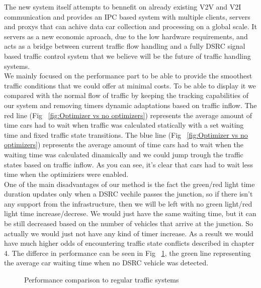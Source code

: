 \documentclass[17pt]{report}
\begin{document}
\indent
The new system itself attempts to bennefit on already existing V2V and V2I
communication and provides an IPC based system with multiple clients, servers
and proxys that can achive data car collection and processing on a global scale.
It servers as a new economic aproach, due to the low hardware requirements,
and acts as a bridge between current traffic flow handling and a fully 
DSRC signal based traffic control system that we believe will be the 
future of traffic handling systems. \\
\indent 
We mainly focused on the performance part to be able to provide
the smoothest traffic conditions that we could offer at minimal costs.
To be able to display it we compared with the normal 
flow of traffic by keeping the tracking capabilities of our system 
and removing timers dynamic adaptations based on traffic inflow. 
The red line (Fig ~\ref{fig:Optimizer vs no optimizers}) represents the 
average amount of time cars had to wait when traffic was 
calculated statically with a set waiting time and fixed traffic state 
transitions. The blue line (Fig ~\ref{fig:Optimizer vs no optimizers}) 
represents the average amount of time cars had to wait when the 
waiting time was calculated dinamically and we could jump trough 
the traffic states based on traffic inflow. As you can see,
it's clear that cars had to wait less time when the optimiziers
were enabled. \\
\indent 
One of the main disadvantages of our method is the fact the
green/red light time duration updates only when a DSRC vechile
passes the junction, so if there isn't any support from the infrastructure,
then we will be left with no green light/red light time increase/decrese.
We would just have the same waiting time, but it can be still decreased 
based on the number of vehicles that arrive at the junction. So actually
we would just not have any kind of timer increase. As a result we would 
have much higher odds of encountering traffic state conflicts described in 
chapter 4. The differce in performance can be seen in Fig 
~\ref{fig:All Optimizer vs no timer duration update}, the green line 
representing the average car waiting time when no DSRC vehicle was 
detected.
\begin{figure}[h!]
    \centering
    \label{fig:All Optimizer vs no timer duration update}
    \caption{Performance comparison to regular traffic systems}
\end{figure}
\end{document}
